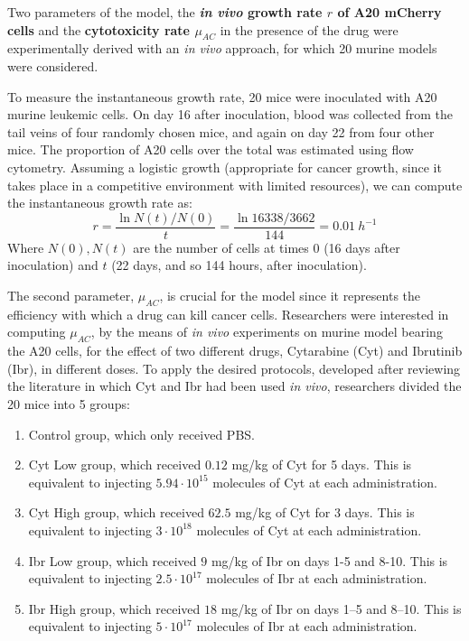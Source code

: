 Two parameters of the model, the \textbf{\textit{in vivo} growth rate $r$ of A20 mCherry cells} and the \textbf{cytotoxicity rate $\mu_{AC}$} in the presence of the drug were experimentally derived with an \textit{in vivo} approach, for which 20 murine models were considered. \par
\vspace{0.4cm}
To measure the instantaneous growth rate, 20 mice were inoculated with A20 murine leukemic cells. On day 16 after inoculation, blood was collected from the tail veins of four randomly chosen mice, and again on day 22 from four other mice. The proportion of A20 cells over the total was estimated using flow cytometry. Assuming a logistic growth (appropriate for cancer growth, since it takes place in a competitive environment with limited resources), we can compute the instantaneous growth rate as: 
\[ r = \frac{\ln{N(t)/N(0)}}{t} = \frac{\ln{16338/3662}}{144} = 0.01\ h^{-1} \]
Where $N(0), N(t)$ are the number of cells at times $0$ (16 days after inoculation) and $t$ (22 days, and so 144 hours, after inoculation).\\ \par
\vspace{0.4cm}
The second parameter, $\mu_{AC}$, is crucial for the model since it represents the efficiency with which a drug can kill cancer cells. Researchers were interested in computing $\mu_{AC}$, by the means of \textit{in vivo} experiments on murine model bearing the A20 cells, for the effect of two different drugs, Cytarabine (Cyt) and Ibrutinib (Ibr), in different doses. To apply the desired protocols, developed after reviewing the literature in which Cyt and Ibr had been used \textit{in vivo}, researchers divided the 20 mice into 5 groups:\begin{enumerate}
	\item Control group, which only received PBS.
	\item Cyt Low group, which received $0.12$ mg/kg of Cyt for 5 days. This is equivalent to injecting $5.94 \cdot 10^{15}$ molecules of Cyt at each
	administration. 
	\item Cyt High group, which received $62.5$ mg/kg of Cyt for 3 days. This is equivalent to injecting $3 \cdot 10^{18}$ molecules of Cyt at each
	administration. 
	\item Ibr Low group, which received $9$ mg/kg of Ibr on days 1-5 and 8-10. This is equivalent to injecting $2.5 \cdot 10^{17}$ molecules of Ibr at 
	each administration. 
	\item Ibr High group, which received $18$ mg/kg of Ibr on days 1–5 and 8–10. This is equivalent to injecting $5 \cdot 10^{17}$ molecules of Ibr at 
	each administration. 
\end{enumerate}
